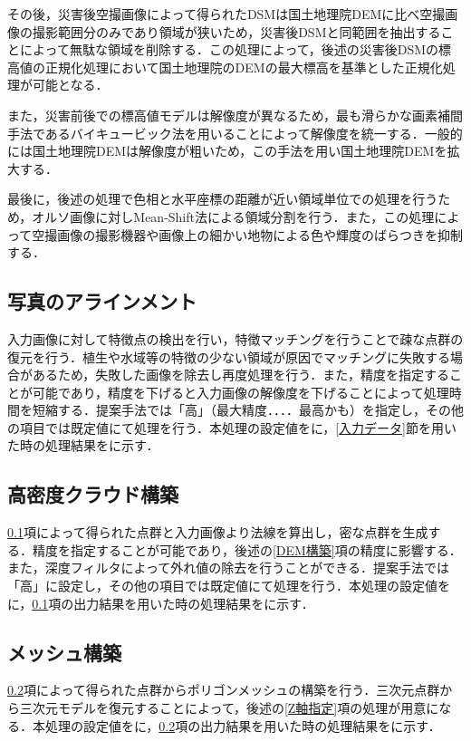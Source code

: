     その後，災害後空撮画像によって得られたDSMは国土地理院DEMに比べ空撮画像の撮影範囲分のみであり領域が狭いため，災害後DSMと同範囲を抽出することによって無駄な領域を削除する．この処理によって，後述の災害後DSMの標高値の正規化処理において国土地理院のDEMの最大標高を基準とした正規化処理が可能となる．
  
    また，災害前後での標高値モデルは解像度が異なるため，最も滑らかな画素補間手法であるバイキュービック法\cite{論文手法1}を用いることによって解像度を統一する．一般的には国土地理院DEMは解像度が粗いため，この手法を用い国土地理院DEMを拡大する．

    最後に，後述の処理で色相と水平座標の距離が近い領域単位での処理を行うため，オルソ画像に対しMean-Shift法\cite{論文手法2}による領域分割を行う．また，この処理によって空撮画像の撮影機器や画像上の細かい地物による色や輝度のばらつきを抑制する．


    \subsection{写真のアラインメント}
      \label{写真のアラインメント}
      入力画像に対して特徴点の検出を行い，特徴マッチングを行うことで疎な点群の復元を行う．植生や水域等の特徴の少ない領域が原因でマッチングに失敗する場合があるため，失敗した画像を除去し再度処理を行う．また，精度を指定することが可能であり，精度を下げると入力画像の解像度を下げることによって処理時間を短縮する．提案手法では「高」（最大精度．．．．最高かも）を指定し，その他の項目では既定値にて処理を行う．本処理の設定値を\fref{}に，\ref{入力データ}節を用いた時の処理結果を\fref{}に示す．

    \subsection{高密度クラウド構築}
      \label{高密度クラウド構築}
      \ref{写真のアラインメント}項によって得られた点群と入力画像より法線を算出し，密な点群を生成する．精度を指定することが可能であり，後述の\ref{DEM構築}項の精度に影響する．また，深度フィルタによって外れ値の除去を行うことができる．提案手法では「高」に設定し，その他の項目では既定値にて処理を行う．本処理の設定値を\fref{}に，\ref{写真のアラインメント}項の出力結果を用いた時の処理結果を\fref{}に示す．

    \subsection{メッシュ構築}
      \label{メッシュ構築}
      \ref{高密度クラウド構築}項によって得られた点群からポリゴンメッシュの構築を行う．三次元点群から三次元モデルを復元することによって，後述の\ref{Z軸指定}項の処理が用意になる．本処理の設定値を\fref{}に，\ref{高密度クラウド構築}項の出力結果を用いた時の処理結果を\fref{}に示す．


